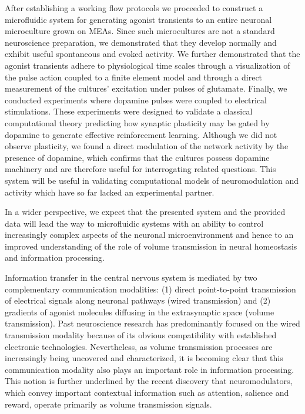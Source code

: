 After establishing a working flow protocols we proceeded to construct a microfluidic system for generating agonist transients to an entire neuronal microculture grown on MEAs. Since such microcultures are not a standard neuroscience preparation, we demonstrated that they develop normally and exhibit useful spontaneous and evoked activity. We further demonstrated that the agonist transients adhere to physiological time scales through a visualization of the pulse action coupled to a finite element model and through a direct measurement of the cultures' excitation under pulses of glutamate. Finally, we conducted experiments where dopamine pulses were coupled to electrical stimulations. These experiments were designed to validate a classical computational theory predicting how synaptic plasticity may be gated by dopamine to generate effective reinforcement learning. Although we did not observe plasticity, we found a direct modulation of the network activity by the presence of dopamine, which confirms that the cultures possess dopamine machinery and are therefore useful for interrogating related questions. This system will be useful in validating computational models of neuromodulation and activity which have so far lacked an experimental partner.

In a wider perspective, we expect that the presented system and the provided data will lead the way to microfluidic systems with an ability to control increasingly complex aspects of the neuronal microenvironment and hence to an improved understanding of the role of volume transmission in neural homeostasis and information processing.


Information transfer in the central nervous system is mediated by two complementary communication modalities: (1) direct point-to-point transmission of electrical signals along neuronal pathways (wired transmission) and (2) gradients of agonist molecules diffusing in the extrasynaptic space (volume transmission). Past neuroscience research has predominantly focused on the wired transmission modality because of its obvious compatibility with established electronic technologies. Nevertheless, as volume transmission processes are increasingly being uncovered and characterized, it is becoming clear that this communication modality also plays an important role in information processing. This notion is further underlined by the recent discovery that neuromodulators, which convey important contextual information such as attention, salience and reward, operate primarily as volume transmission signals.

